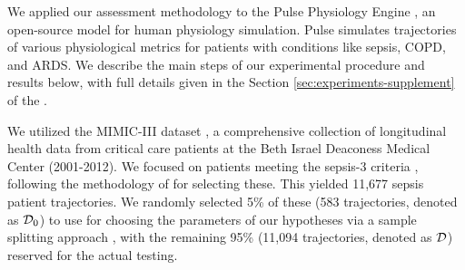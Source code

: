We applied our assessment methodology to the Pulse Physiology Engine \citep{pulse}, an open-source model for human physiology simulation.
Pulse simulates trajectories of various physiological metrics for patients with conditions like sepsis, COPD, and ARDS.
We describe the main steps of our experimental procedure and results below, with full details given in the Section \ref{sec:experiments-supplement} of the \AppendixName. 


We utilized the MIMIC-III dataset \citep{mimic}, a comprehensive collection of longitudinal health data from critical care patients at the Beth Israel Deaconess Medical Center (2001-2012).
We focused on patients meeting the sepsis-3 criteria \citep{sepsis-criteria}, following the methodology of \cite{ai-clinician} for selecting these.
This yielded 11,677 sepsis patient trajectories.
We randomly selected 5\% of these (583 trajectories, denoted as $\mathcal{D}_0$) to use for choosing the parameters of our hypotheses via a sample splitting approach \citep{cox1975note}, with the remaining 95\% (11,094 trajectories, denoted as $\mathcal{D}$) reserved for the actual testing.





